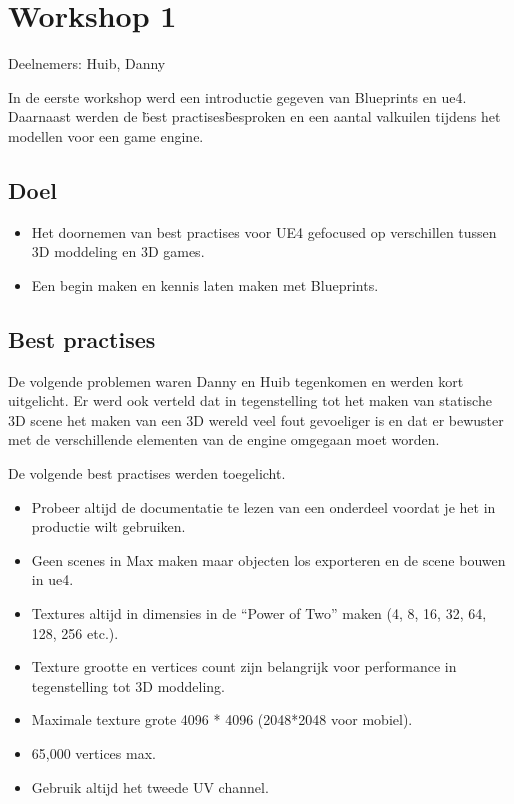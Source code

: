 
\chapter{Workshop 1}
\label{appendix:workshop1}
\lhead{}
Deelnemers: Huib, Danny

In de eerste workshop werd een introductie gegeven van Blueprints en \gls{ue4}.
Daarnaast werden de \"best practises\" besproken en een aantal valkuilen tijdens het modellen voor een game engine.

\section{Doel}
\begin{itemize}
	\item Het doornemen van best practises voor UE4 gefocused op verschillen tussen 3D moddeling en 3D games. 
	\item Een begin maken en kennis laten maken met Blueprints.
\end{itemize}

\section{Best practises}
De volgende problemen waren Danny en Huib tegenkomen en werden kort uitgelicht. Er werd ook verteld dat in tegenstelling tot het maken van statische 3D scene het maken van een 3D wereld veel fout gevoeliger is en dat er bewuster met de verschillende elementen van de engine omgegaan moet worden.

De volgende best practises werden toegelicht.
\begin{itemize}
	\item Probeer altijd de documentatie te lezen van een onderdeel voordat je het in productie wilt gebruiken.
	\item Geen scenes in Max maken maar objecten los exporteren en de scene bouwen in \gls{ue4}.
	\item Textures altijd in dimensies in de “Power of Two” maken (4, 8, 16, 32, 64, 128, 256 etc.).
	\item Texture grootte en vertices count zijn belangrijk voor performance in tegenstelling tot 3D moddeling.
	\item Maximale texture grote 4096 * 4096 (2048*2048 voor mobiel).
	\item 65,000 vertices max.
	\item Gebruik altijd het tweede UV channel.
\end{itemize}

